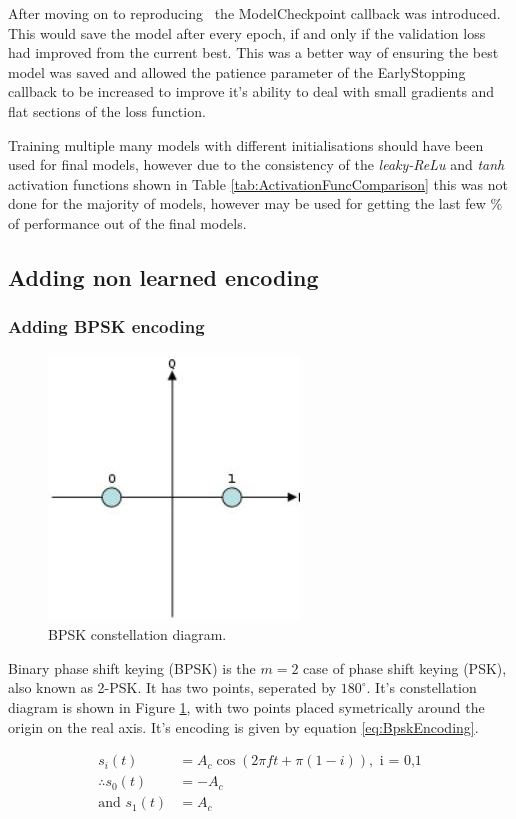 \documentclass[12pt,onecolumn,letterpaper]{article}
\newcommand{\code}{\textit}
\begin{document}
After moving on to reproducing~\cite{Aoudia} the ModelCheckpoint callback was introduced. This would save the model after every epoch, if and only if the validation loss had improved from the current best. This was a better way of ensuring the best model was saved and allowed the patience parameter of the EarlyStopping callback to be increased to improve it's ability to deal with small gradients and flat sections of the loss function.

Training multiple many models with different initialisations should have been used for final models, however due to the consistency of the \code{leaky-ReLu} and \code{tanh} activation functions shown in Table \ref{tab:ActivationFuncComparison} this was not done for the majority of models, however may be used for getting the last few $\%$ of performance out of the final models.  

\subsection{Adding non learned encoding}

\subsubsection{Adding BPSK encoding}
\label{sec:AddingBpsk}

\begin{figure}[t]
   \centering
   \includegraphics[width=0.2\linewidth]{figures/bpsk_const_diag.jpg}
   \caption{BPSK constellation diagram.}
   \label{fig:BspkConstDiag}
\end{figure}

Binary phase shift keying (BPSK) is the $m = 2$ case of phase shift keying (PSK), also known as 2-PSK. It has two points, seperated by $180^\circ$. It's constellation diagram is shown in Figure \ref{fig:BspkConstDiag}, with two points placed symetrically around the origin on the real axis. It's encoding is given by equation \ref{eq:BpskEncoding}.

\begin{subequations}
\begin{align}
   s_i(t) &= A_c \cos(2\pi ft + \pi(1-i)), \mbox{ i = 0,1} \label{eq:BpskEncoding} \\
   \therefore s_0(t) &= -A_c \\
   \mbox{and } s_1(t) &= A_c
\end{align}
\end{subequations}
\end{document}
